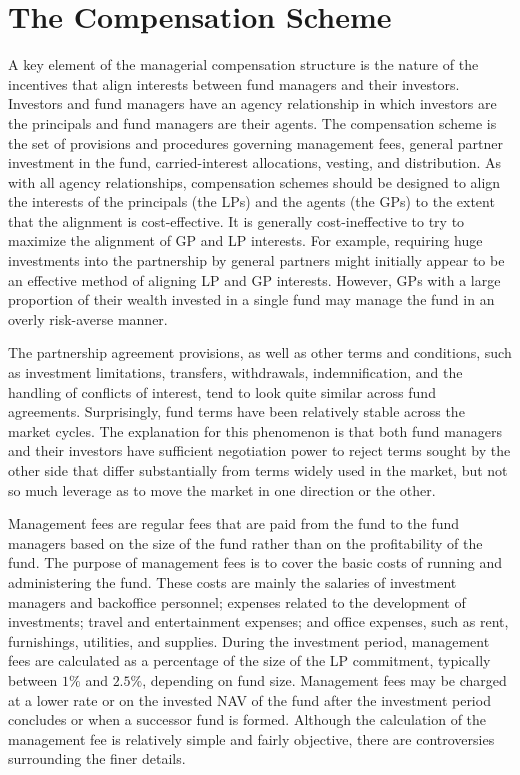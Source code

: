 \documentclass[11pt]{article}
\begin{document}
\section*{The Compensation Scheme}
A key element of the managerial compensation structure is the nature of the incentives that align interests between fund managers and their investors. Investors and fund managers have an agency relationship in which investors are the principals and fund managers are their agents. The compensation scheme is the set of provisions and procedures governing management fees, general partner investment in the fund, carried-interest allocations, vesting, and distribution. As with all agency relationships, compensation schemes should be designed to align the interests of the principals (the LPs) and the agents (the GPs) to the extent that the alignment is cost-effective. It is generally cost-ineffective to try to maximize the alignment of GP and LP interests. For example, requiring huge investments into the partnership by general partners might initially appear to be an effective method of aligning LP and GP interests. However, GPs with a large proportion of their wealth invested in a single fund may manage the fund in an overly risk-averse manner.

The partnership agreement provisions, as well as other terms and conditions, such as investment limitations, transfers, withdrawals, indemnification, and the handling of conflicts of interest, tend to look quite similar across fund agreements. Surprisingly, fund terms have been relatively stable across the market cycles. The explanation for this phenomenon is that both fund managers and their investors have sufficient negotiation power to reject terms sought by the other side that differ substantially from terms widely used in the market, but not so much leverage as to move the market in one direction or the other.

Management fees are regular fees that are paid from the fund to the fund managers based on the size of the fund rather than on the profitability of the fund. The purpose of management fees is to cover the basic costs of running and administering the fund. These costs are mainly the salaries of investment managers and backoffice personnel; expenses related to the development of investments; travel and entertainment expenses; and office expenses, such as rent, furnishings, utilities, and supplies. During the investment period, management fees are calculated as a percentage of the size of the LP commitment, typically between $1 \%$ and $2.5 \%$, depending on fund size. Management fees may be charged at a lower rate or on the invested NAV of the fund after the investment period concludes or when a successor fund is formed. Although the calculation of the management fee is relatively simple and fairly objective, there are controversies surrounding the finer details.
\end{document}
